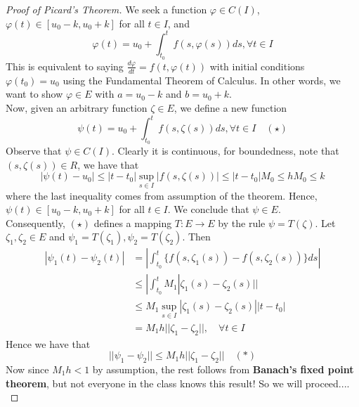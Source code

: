 \documentclass{article}
\begin{document}
\begin{proof}[Proof of Picard's Theorem]
    We seek a function $\varphi \in C(I)$, $\varphi(t) \in [u_0 - k, u_0 + k]$ for all $t \in I$, and
    \[\varphi(t) = u_0 + \int_{t_0}^t f(s, \varphi(s)) ds, \forall t \in I\]
    This is equivalent to saying $\frac{d\varphi}{dt} = f(t, \varphi(t))$ with initial conditions $\varphi(t_0) = u_0$ using the Fundamental Theorem of Calculus. In other words, we want to show $\varphi \in E$ with $a = u_0 - k$ and $b = u_0 + k$.\\

    Now, given an arbitrary function $\zeta \in E$, we define a new function
    \[\psi(t) = u_0 + \int_{t_0}^t f(s, \zeta(s)) ds, \forall t \in I\quad (\star)\]
    Observe that $\psi \in C(I)$. Clearly it is continuous, for boundedness, note that $(s, \zeta(s)) \in R$, we have that
    \[|\psi(t) - u_0| \leq |t - t_0| \sup_{s \in I} |f(s, \zeta(s))| \leq |t - t_0| M_0 \leq h M_0 \leq k\]
    where the last inequality comes from assumption of the theorem. Hence, $\psi(t) \in [u_0 - k, u_0 + k]$ for all $t \in I$. We conclude that $\psi \in E$.\\

    Consequently, $(\star)$ defines a mapping $T: E \to E$ by the rule $\psi = T(\zeta)$. Let $\zeta_1, \zeta_2 \in E$ and $\psi_1 = T(\zeta_1), \psi_2 = T(\zeta_2)$. Then
    \begin{align*}
        |\psi_1(t) - \psi_2(t)| &= |\int_{t_0}^t \{f(s, \zeta_1(s)) - f(s, \zeta_2(s))\} ds|\\
        &\leq |\int_{t_0}^t M_1 |\zeta_1(s) - \zeta_2(s)| | \tag*{Lipschitz in second variables}\\
        &\leq M_1 \sup_{s \in I} |\zeta_1(s) - \zeta_2(s)| |t - t_0|\\
        &= M_1 h ||\zeta_1 - \zeta_2||,\quad \forall t \in I
    \end{align*}
    Hence we have that
    \[||\psi_1 - \psi_2|| \leq M_1 h ||\zeta_1 - \zeta_2|| \quad (*)\]
    Now since $M_1 h < 1$ by assumption, the rest follows from \textbf{Banach's fixed point theorem}, but not everyone in the class knows this result! So we will proceed....\\


\end{proof}
\end{document}
